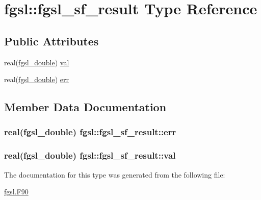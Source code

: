 \hypertarget{structfgsl_1_1fgsl__sf__result}{\section{fgsl\-:\-:fgsl\-\_\-sf\-\_\-result Type Reference}
\label{structfgsl_1_1fgsl__sf__result}
}
\subsection*{Public Attributes}
\begin{DoxyCompactItemize}
\item 
real(\hyperlink{classfgsl_a9af5113378e0f000eb479d3f90196ddf}{fgsl\-\_\-double}) \hyperlink{structfgsl_1_1fgsl__sf__result_a7a6ae6b70ef97531a1dd832ef464c1cf}{val}
\item 
real(\hyperlink{classfgsl_a9af5113378e0f000eb479d3f90196ddf}{fgsl\-\_\-double}) \hyperlink{structfgsl_1_1fgsl__sf__result_a2b5edd0ba1fd8b8cf9998c6422365671}{err}
\end{DoxyCompactItemize}


\subsection{Member Data Documentation}
\hypertarget{structfgsl_1_1fgsl__sf__result_a2b5edd0ba1fd8b8cf9998c6422365671}{
\subsubsection[{err}]{\setlength{\rightskip}{0pt plus 5cm}real({\bf fgsl\-\_\-double}) fgsl\-::fgsl\-\_\-sf\-\_\-result\-::err}}\label{structfgsl_1_1fgsl__sf__result_a2b5edd0ba1fd8b8cf9998c6422365671}
\hypertarget{structfgsl_1_1fgsl__sf__result_a7a6ae6b70ef97531a1dd832ef464c1cf}{
\subsubsection[{val}]{\setlength{\rightskip}{0pt plus 5cm}real({\bf fgsl\-\_\-double}) fgsl\-::fgsl\-\_\-sf\-\_\-result\-::val}}\label{structfgsl_1_1fgsl__sf__result_a7a6ae6b70ef97531a1dd832ef464c1cf}


The documentation for this type was generated from the following file\-:\begin{DoxyCompactItemize}
\item 
\hyperlink{fgsl_8F90}{fgsl.\-F90}\end{DoxyCompactItemize}
